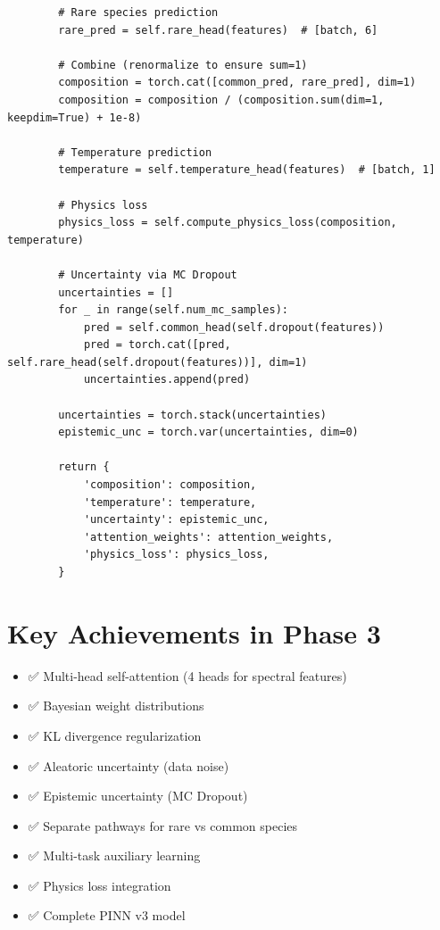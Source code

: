 \documentclass[12pt,a4paper,oneside]{report}
\begin{document}
\begin{lstlisting}
        # Rare species prediction
        rare_pred = self.rare_head(features)  # [batch, 6]

        # Combine (renormalize to ensure sum=1)
        composition = torch.cat([common_pred, rare_pred], dim=1)
        composition = composition / (composition.sum(dim=1, keepdim=True) + 1e-8)

        # Temperature prediction
        temperature = self.temperature_head(features)  # [batch, 1]

        # Physics loss
        physics_loss = self.compute_physics_loss(composition, temperature)

        # Uncertainty via MC Dropout
        uncertainties = []
        for _ in range(self.num_mc_samples):
            pred = self.common_head(self.dropout(features))
            pred = torch.cat([pred, self.rare_head(self.dropout(features))], dim=1)
            uncertainties.append(pred)

        uncertainties = torch.stack(uncertainties)
        epistemic_unc = torch.var(uncertainties, dim=0)

        return {
            'composition': composition,
            'temperature': temperature,
            'uncertainty': epistemic_unc,
            'attention_weights': attention_weights,
            'physics_loss': physics_loss,
        }
\end{lstlisting}

\section{Key Achievements in Phase 3}

\begin{itemize}
    \item ✅ Multi-head self-attention (4 heads for spectral features)
    \item ✅ Bayesian weight distributions
    \item ✅ KL divergence regularization
    \item ✅ Aleatoric uncertainty (data noise)
    \item ✅ Epistemic uncertainty (MC Dropout)
    \item ✅ Separate pathways for rare vs common species
    \item ✅ Multi-task auxiliary learning
    \item ✅ Physics loss integration
    \item ✅ Complete PINN v3 model
\end{itemize}
\end{document}
